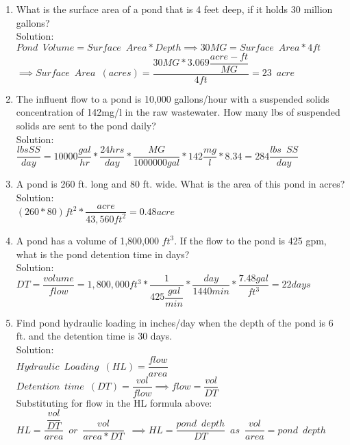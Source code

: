 \begin{enumerate}
\item What is the surface area of a pond that is 4 feet deep, if it holds 30 million gallons?\\

Solution:\\
$Pond \enspace Volume= Surface \enspace Area*Depth \implies 30MG=Surface \enspace Area*4ft$\\
$ \implies Surface \enspace Area \enspace (acres)=\dfrac{30MG*3.069\dfrac{acre-ft}{MG}}{4ft}=\boxed{23 \enspace acre}$
\item The influent flow to a pond is 10,000 gallons/hour with a suspended solids concentration of 142mg/l in the raw wastewater.  How many lbs of suspended solids are sent to the pond daily?
\\
Solution:\\
$\dfrac{lbs SS}{day}=10000\dfrac{gal}{hr}*\dfrac{24hrs}{day}*\dfrac{MG}{1000000gal}*142\dfrac{mg}{l}*8.34=\boxed{284\dfrac{lbs \enspace SS}{day}}$
\item A pond is 260 ft. long and 80 ft. wide. What is the area of this pond in acres?\\ 
Solution:\\
$(260*80)ft^2*\dfrac{acre}{43,560ft^2}=\boxed{0.48acre}$
\item A pond has a volume of 1,800,000 $ft^3$. If the flow to the pond is 425 gpm, what is the pond detention time in days?
\\
Solution:\\
$DT=\dfrac{volume}{flow}=1,800,000ft^3*\dfrac{1}{425\dfrac{gal}{min}}*\dfrac{day}{1440min}*\dfrac{7.48gal}{ft^3}=\boxed{22days}$
\item Find pond hydraulic loading in inches/day when the depth of the pond is 6 ft. and the detention time is 30 days.\\
Solution:\\

$Hydraulic \enspace Loading \enspace (HL)=\dfrac{flow}{area}$\\
$Detention \enspace time \enspace (DT)=\dfrac{vol}{flow} \implies flow=\dfrac{vol}{DT} $\\
Substituting \enspace for \enspace flow \enspace in \enspace the HL \enspace formula above:\\
$HL=\dfrac{\dfrac{vol}{DT}}{area}\enspace or \enspace \dfrac{vol}{area*DT} \enspace \implies \boxed{HL=\dfrac{pond \enspace depth}{DT}} \enspace as \enspace \dfrac{vol}{area}=pond \enspace depth$\\


\end{enumerate}
